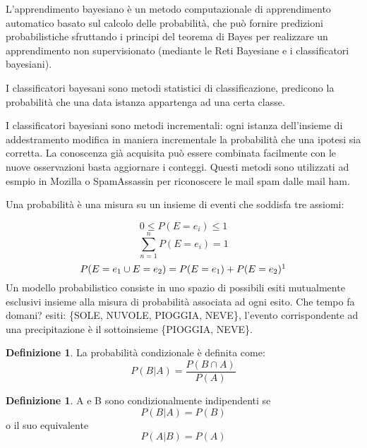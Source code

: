 \documentclass{article}
\theoremstyle{plain}
\theoremstyle{definition}
\newtheorem{defn}[]{Definizione} %
\begin{document}
L'apprendimento bayesiano è un metodo computazionale di apprendimento automatico basato sul calcolo delle probabilità, che può fornire predizioni probabilistiche sfruttando i principi del teorema di Bayes per realizzare un apprendimento non supervisionato (mediante le Reti Bayesiane e i classificatori bayesiani).

 I classificatori bayesani sono metodi statistici di classificazione, predicono la probabilità che una data istanza appartenga ad una certa classe.


I classificatori bayesiani sono metodi incrementali: ogni istanza dell’insieme di addestramento modifica in maniera incrementale la probabilità che una ipotesi sia corretta.
La conoscenza già acquisita può essere combinata facilmente con le nuove osservazioni basta aggiornare i conteggi. Questi metodi sono utilizzati ad esmpio in Mozilla o SpamAssassin per riconoscere le mail spam dalle mail ham.\footnotemark


Una probabilità è una misura su un insieme di eventi che soddisfa tre assiomi:

$$0≤P(E=e_i)≤1$$
$$\sum_{n=1}^{n} P(E=e_i)=1$$
$$P(E=e_1\cup E=e_2)=P(E=e_1)+P(E=e_2)\footnotemark$$
Un modello probabilistico consiste in uno spazio di possibili esiti mutualmente esclusivi insieme alla misura di probabilità associata ad ogni esito.
Che tempo fa domani? esiti: \{SOLE, NUVOLE, PIOGGIA, NEVE\}, l’evento corrispondente ad una precipitazione è il sottoinsieme \{PIOGGIA, NEVE\}.
\begin{defn}
	La probabilità condizionale è definita come: $$P(B|A)=\frac{P(B \cap A)}{P(A)}$$
\end{defn}
\begin{defn}
	A e B sono condizionalmente indipendenti se $$P(B|A)=P(B)$$ o il suo equivalente $$P(A|B)=P(A)$$
\end{defn}
\end{document}

